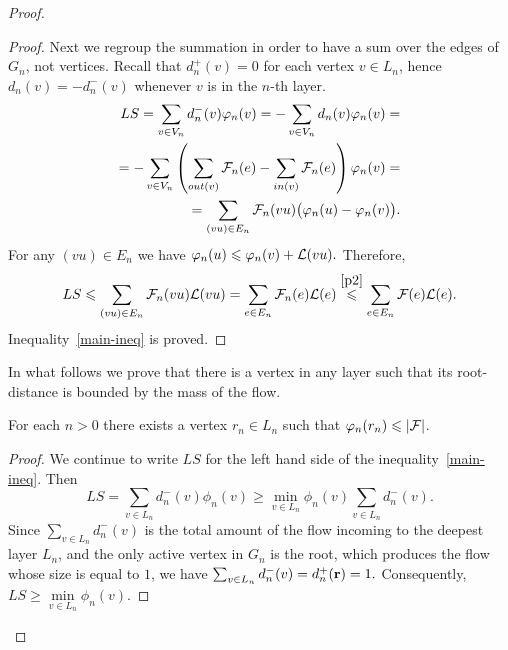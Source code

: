 \documentclass[12pt,oneside,a4paper]{amsart}
\begin{document}
\begin{proof}
\begin{proof}
            Next we regroup the summation in order to have a sum over the edges of $G_n$, not vertices.
            Recall that $d_n^{+}(v) = 0$ for each vertex $v \in L_n$,
              hence $d_n(v) = -d_n^{-}(v)$ whenever $v$ is in the $n$-th layer.
            \begin{align*}
              LS = \sum_{v \in V_n} d_n^{-}(v) \varphi_n(v) = -\sum\limits_{v \in V_n} d_n(v) \varphi_n(v) =\\
              =-\sum_{v \in V_n} \left(\sum_{out(v)} \mathcal{F}_{n}(e) - \sum_{in(v)}\mathcal{F}_{n}(e) \right) \varphi_n(v)=\\
              =\sum_{(vu) \in E_n} \mathcal{F}_{n}(vu) \big(\varphi_n(u) - \varphi_n(v)\big).
            \end{align*}
            For any $(vu) \in E_n$ we have $\varphi_n(u) \leqslant \varphi_n(v) + \mathcal{L}(vu).$
            Therefore,
            \[
              LS\leqslant\sum_{(vu) \in E_n} \mathcal{F}_{n}(vu) \mathcal{L}(vu)= \sum_{e \in E_n} \mathcal{F}_{n}(e) \mathcal{L}(e) \overset{\ref{p2}}{\leqslant} \sum_{e \in E_n} \mathcal{F}(e) \mathcal{L}(e).
            \]
            Inequality~\eqref{main-ineq} is proved.
          \end{proof}

          In what follows we prove that there is a vertex in any layer such that its root-distance is bounded by the mass of the flow.
          \begin{prop}
            \label{prop36}
            For each $n > 0$ there exists a vertex $r_n \in L_n$ such that $\varphi_n(r_n) \leqslant \lvert\mathcal{F}\rvert$.
          \end{prop}
          \begin{proof}
            We continue to write $LS$ for the left hand side of the inequality~\eqref{main-ineq}.
            Then
            \[
              LS = \sum_{v \in L_n}d^{-}_n(v) \phi_n(v) \geq \min_{v \in L_n}\phi_n(v) \sum_{v \in L_n} d^{-}_n(v).
            \]
            Since $\sum_{v \in L_n} d^{-}_n(v)$ is the total amount of the flow incoming to the deepest layer $L_n$, and the only
              active vertex in $G_n$ is the root, which produces the flow whose size is equal to $1$, we have $\sum_{v \in L_n} d^{-}_n(v) = d^{+}_n(\mathbf{r}) = 1.$
            Consequently, $LS \geq \min\limits_{v \in L_n} \phi_n(v).$


\end{proof}
\end{proof}
\end{document}
